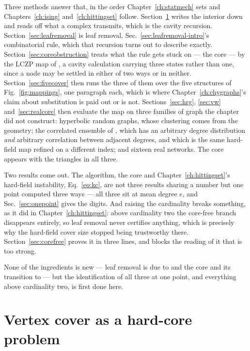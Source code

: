 Three methods answer that, in the order Chapter~\ref{ch:statmech} sets and
Chapters~\ref{ch:ising} and~\ref{ch:hittingset} follow.
Section~\ref{sec:twoconstraints} writes the interior down and reads off what a
complex transmits, which is the cavity recursion.
Section~\ref{sec:leafremoval} is leaf removal,
Sec.~\ref{sec:leafremoval-intro}'s combinatorial rule, which that recursion
turns out to describe exactly. Section~\ref{sec:coreobstruction} treats what
the rule gets stuck on --- the core --- by the LCZP map of \citet{liu2012}, a
cavity calculation carrying three states rather than one, since a node may be
settled in either of two ways or in neither.
Section~\ref{sec:fivecover} then runs the three of them over the five
structures of Fig.~\ref{fig:mappings}, one paragraph each, which is where
Chapter~\ref{ch:chygraphs}'s claim about substitution is paid out or is not.
Sections~\ref{sec:hrg}, \ref{sec:vw} and~\ref{sec:realcore} then evaluate
the map on three families of graph the chapter did not construct: hyperbolic
random graphs, whose clustering comes from the geometry; the correlated
ensemble of \citet{vazquez2003vw}, which has an arbitrary degree distribution
\emph{and} arbitrary correlation between adjacent degrees, and which is the
same hard-field map refined on a different index; and sixteen real networks.
The core appears with the triangles in all three.

Two results come out. The algorithm, the core and
Chapter~\ref{ch:hittingset}'s hard-field instability, Eq.~\eqref{eq:kc}, are
not three results sharing a number but one point computed three ways --- all
three sit at mean degree $e$, and Sec.~\ref{sec:onepoint} gives the digits. And
raising the cardinality breaks something, as it did in
Chapter~\ref{ch:hittingset}: above cardinality two the core-free branch
disappears entirely, so leaf removal never certifies anything, which is
precisely why the hard-field cover size stopped being trustworthy there.
Section~\ref{sec:corefree} proves it in three lines, and blocks the reading of
it that is too strong.

None of the ingredients is new --- leaf removal is due to \citet{bauer2001} and
the core and its transition to \citet{liu2012} --- but the identification of
all three at one point, and everything above cardinality two, is first done
here.

\section{Vertex cover as a hard-core problem}
\label{sec:twoconstraints}

